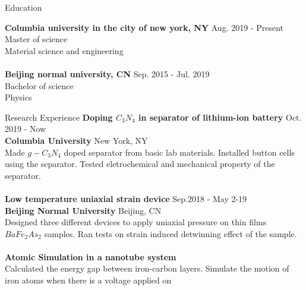 \documentclass{resume} %
\begin{document}

\begin{rSection}{Education}

{\bf Columbia university in the city of new york, NY} \hfill { Aug. 2019 - Present} 
\\ Master of science
\\ Material science and engineering\\
\\
{\bf Beijing normal university, CN} \hfill { Sep. 2015 - Jul. 2019} 
\\ Bachelor of science
\\ Physics

\end{rSection}

\begin{rSection}{Research Experience}
{\bf Doping $C_3N_4$ in separator of lithium-ion battery} \hfill{ Oct. 2019 - Now}
\\{\bf Columbia University} \hfill{New York, NY}
\\Made $g-C_3N_4$ doped separator from basic lab materials. Installed button cells using the separator. Tested eletrochemical and mechanical property of the separator.\\

\\{\bf Low temperature uniaxial strain device} \hfill{Sep.2018 - May 2-19 }
\\{\bf Beijing Normal University} \hfill{Beijing, CN}
\\Designed three different devices to apply uniaxial pressure on thin films $BaFe_2As_2$ samples. Ran tests on strain induced detwinning effect of the sample.\\

\\{\bf Atomic Simulation in a nanotube system} \hfill{}
\\Calculated the energy gap between iron-carbon layers. Simulate the motion of iron atoms when there is a voltage applied on

\end{rSection}
\end{document}
